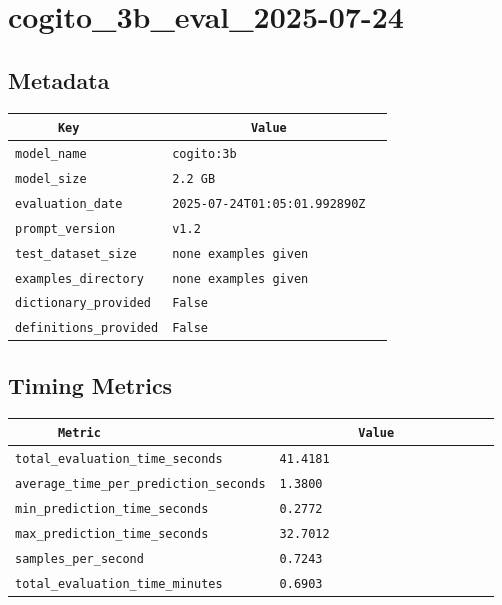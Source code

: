 \documentclass{article}
\begin{document}
\section{cogito\_3b\_eval\_2025-07-24}
\subsection{Metadata}

\begin{center}
\begin{tabular}{l | l} \hline
    \verb|      Key      | & \verb|           Value           | \\ \hline
    \hline
    \verb|model_name    | & \verb|cogito:3b                    | \\ \hline
    \verb|model_size    | & \verb|2.2 GB                       | \\ \hline
    \verb|evaluation_date| & \verb|2025-07-24T01:05:01.992890Z  | \\ \hline
    \verb|prompt_version| & \verb|v1.2                         | \\ \hline
    \verb|test_dataset_size| & \verb|none examples given          | \\ \hline
    \verb|examples_directory| & \verb|none examples given          | \\ \hline
    \verb|dictionary_provided| & \verb|False                        | \\ \hline
    \verb|definitions_provided| & \verb|False                        | \\ \hline
\end{tabular}
\end{center}

\subsection{Timing Metrics}

\begin{center}
\begin{tabular}{l | l} \hline
    \verb|      Metric     | & \verb|           Value           | \\ \hline
    \hline
    \verb|total_evaluation_time_seconds| & \verb|41.4181                      | \\ \hline
    \verb|average_time_per_prediction_seconds| & \verb|1.3800                       | \\ \hline
    \verb|min_prediction_time_seconds| & \verb|0.2772                       | \\ \hline
    \verb|max_prediction_time_seconds| & \verb|32.7012                      | \\ \hline
    \verb|samples_per_second| & \verb|0.7243                       | \\ \hline
    \verb|total_evaluation_time_minutes| & \verb|0.6903                       | \\ \hline
\end{tabular}
\end{center}
\end{document}
